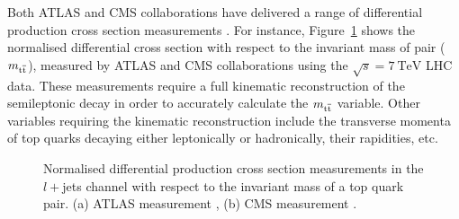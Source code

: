 Both ATLAS and CMS collaborations have delivered a range of differential \ttbar production cross section measurements
\autocite{ATLAS_diff_xsections_7TeV, CMS_diff_xsections_7TeV}. For instance, Figure~\ref{fig:ATLAS_CMS_diff_xsections}
shows the normalised differential cross section with respect to the invariant mass of \ttbar pair ($m_{\mathrm{t}\overline{\mathrm{t}}}$),
measured by ATLAS and CMS collaborations using the $\sqrt{s} = \SI{7}{\TeV}$ LHC data. These measurements require a full
kinematic reconstruction of the semileptonic \ttbar decay in order to accurately calculate the $m_{\mathrm{t}\overline{\mathrm{t}}}$ variable.
Other variables requiring the kinematic reconstruction include the transverse momenta of top quarks decaying either
leptonically or hadronically, their rapidities, etc.

\begin{figure}[hbtp]
   \centering
   \caption[Normalised differential \ttbar production cross section measurements by ATLAS and CMS
   collaborations]{Normalised differential \ttbar production cross section measurements in the $l+$jets channel with
   respect to the invariant mass of a top quark pair. (a) ATLAS measurement \autocite{ATLAS_diff_xsections_7TeV}, (b)
   CMS measurement \autocite{CMS_diff_xsections_7TeV}.}
   \label{fig:ATLAS_CMS_diff_xsections}
\end{figure}

